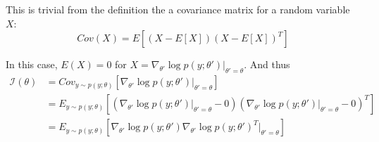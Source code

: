 \begin{answer}
    This is trivial from the definition the a covariance matrix for a random variable $X$:
    $$
    Cov(X) = E[(X - E[X])(X - E[X])^T]
    $$

    In this case, $E(X) = 0$ for $X = \nabla_{\theta'}\log p(y;\theta') |_{\theta'=\theta}$. And thus
    $$
    \begin{aligned}
        \mathcal I(\theta) &= Cov_{y\sim p(y;\theta)}[\nabla_{\theta'}\log p(y;\theta')|_{\theta' = \theta}] \\
        &= E_{y\sim p(y;\theta)}[(\nabla_{\theta'}\log p(y;\theta')|_{\theta' = \theta} - 0)(\nabla_{\theta'}\log p(y;\theta')|_{\theta' = \theta} - 0)^T]\\
        &= E_{y\sim p(y;\theta)}[\nabla_{\theta'}\log p(y;\theta')\nabla_{\theta'}\log p(y;\theta')^T|_{\theta' = \theta}]\\
    \end{aligned}
    $$

\end{answer}
